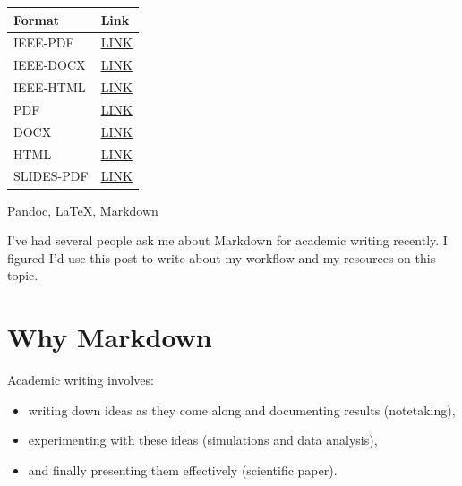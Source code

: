 \documentclass[journal,]{IEEEtran}
\makeatletter
\providecommand{\tightlist}{%
  \setlength{\itemsep}{0pt}\setlength{\parskip}{0pt}}
\newcounter{tableno}
\newenvironment{tablenos:no-prefix-table-caption}{
  \caption@ifcompatibility{}{
    \let\oldthetable\thetable
    \let\oldtheHtable\theHtable
    \renewcommand{\thetable}{tableno:\thetableno}
    \renewcommand{\theHtable}{tableno:\thetableno}
    \stepcounter{tableno}
    \captionsetup{labelformat=empty}
  }
}{
  \caption@ifcompatibility{}{
    \captionsetup{labelformat=default}
    \let\thetable\oldthetable
    \let\theHtable\oldtheHtable
    \addtocounter{table}{-1}
  }
}
\makeatother
\begin{document}
\begin{tablenos:no-prefix-table-caption}

\begin{longtable}[]{@{}ll@{}}
\toprule
Format & Link\tabularnewline
\midrule
\endhead
IEEE-PDF &
\href{https://kdheepak.com/blog/writing-papers-with-markdown/www/writing-papers-with-markdown.ieee.pdf}{LINK}\tabularnewline
IEEE-DOCX &
\href{https://kdheepak.com/blog/writing-papers-with-markdown/www/writing-papers-with-markdown.ieee.docx}{LINK}\tabularnewline
IEEE-HTML &
\href{https://kdheepak.com/blog/writing-papers-with-markdown/www/writing-papers-with-markdown.ieee.html}{LINK}\tabularnewline
PDF &
\href{https://kdheepak.com/blog/writing-papers-with-markdown/www/writing-papers-with-markdown.pdf}{LINK}\tabularnewline
DOCX &
\href{https://kdheepak.com/blog/writing-papers-with-markdown/www/writing-papers-with-markdown.docx}{LINK}\tabularnewline
HTML &
\href{https://kdheepak.com/blog/writing-papers-with-markdown/www/writing-papers-with-markdown.html}{LINK}\tabularnewline
SLIDES-PDF &
\href{https://kdheepak.com/blog/writing-papers-with-markdown/www/writing-papers-with-markdown.slides.pdf}{LINK}\tabularnewline
\bottomrule
\end{longtable}

\end{tablenos:no-prefix-table-caption}

\begin{IEEEkeywords}
Pandoc, LaTeX, Markdown
\end{IEEEkeywords}

I've had several people ask me about Markdown for academic writing
recently. I figured I'd use this post to write about my workflow and my
resources on this topic.

\hypertarget{why-markdown}{%
\section{Why Markdown}\label{why-markdown}}

Academic writing involves:

\begin{itemize}
\tightlist
\item
  writing down ideas as they come along and documenting results
  (notetaking),
\item
  experimenting with these ideas (simulations and data analysis),
\item
  and finally presenting them effectively (scientific paper).
\end{itemize}
\end{document}
